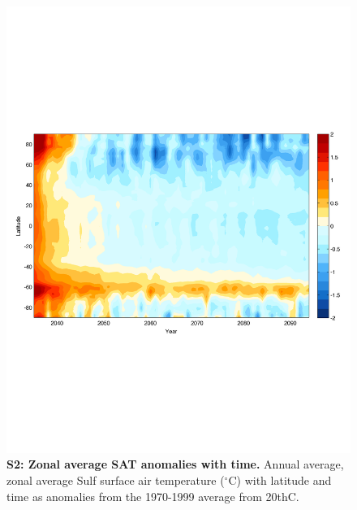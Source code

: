 \documentclass{nature}
\begin{document}
\begin{figure}%
\noindent\includegraphics[width=39pc]{figures/SuppFig2.pdf}  %
\caption{\textbf{S2: Zonal average SAT anomalies with time.} Annual average, zonal average Sulf surface air temperature ($^\circ$C) with latitude and time as anomalies from the 1970-1999 average from 20thC.}
\label{fig:supp1}
\end{figure}
\end{document}
